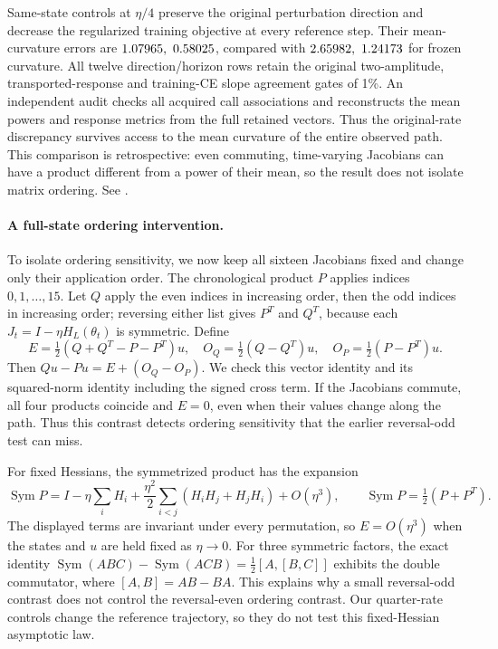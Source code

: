 \documentclass[11pt,letterpaper]{article}
\begin{document}
Same-state controls at $\eta/4$ preserve the original perturbation direction
and decrease the regularized training objective at every reference step.
Their mean-curvature errors are $1.07965,\ 0.58025$, compared with
$2.65982,\ 1.24173$ for frozen curvature. All twelve direction/horizon
rows retain the original two-amplitude, transported-response and training-CE
slope agreement gates of 1\%. An independent audit checks all
\nLMMeanCalls{} acquired call associations and reconstructs the mean powers
and response metrics from the full retained vectors.
Thus the original-rate discrepancy survives access to the mean curvature of
the entire observed path. This comparison is retrospective: even commuting,
time-varying Jacobians can have a product different from a power of their mean,
so the result does not isolate matrix ordering.
See .

\paragraph{A full-state ordering intervention.}
To isolate ordering sensitivity, we now keep all sixteen Jacobians fixed and
change only their application order. The chronological product $P$ applies
indices $0,1,\ldots,15$. Let $Q$ apply the even indices in increasing order,
then the odd indices in increasing order; reversing either list gives $P^T$
and $Q^T$, because each $J_t=I-\eta H_L(\theta_t)$ is symmetric. Define
\[
 E=\tfrac12(Q+Q^T-P-P^T)u,\quad
 O_Q=\tfrac12(Q-Q^T)u,\quad O_P=\tfrac12(P-P^T)u.
\]
Then $Qu-Pu=E+(O_Q-O_P)$. We check this vector identity and its squared-norm
identity including the signed cross term. If the Jacobians commute, all four
products coincide and $E=0$, even when their values change along the path.
Thus this contrast detects ordering sensitivity that the earlier
reversal-odd test can miss.

For fixed Hessians, the symmetrized product has the expansion
\[
 \operatorname{Sym}P
 =I-\eta\sum_i H_i
  +\frac{\eta^2}{2}\sum_{i<j}(H_iH_j+H_jH_i)+O(\eta^3),
 \qquad \operatorname{Sym}P=\tfrac12(P+P^T).
\]
The displayed terms are invariant under every permutation, so
$E=O(\eta^3)$ when the states and $u$ are held fixed as $\eta\to0$.
For three symmetric factors, the exact identity
$\operatorname{Sym}(ABC)-\operatorname{Sym}(ACB)=\tfrac12[A,[B,C]]$
exhibits the double commutator, where $[A,B]=AB-BA$.
This explains why a small reversal-odd contrast does not control the
reversal-even ordering contrast. Our quarter-rate controls change the
reference trajectory, so they do not test this fixed-Hessian asymptotic law.
\end{document}
